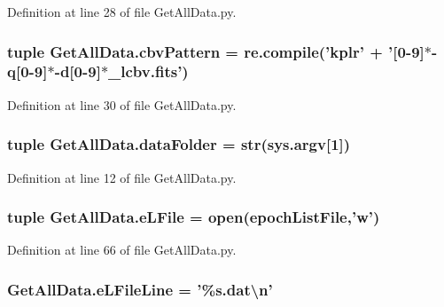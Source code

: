 Definition at line 28 of file Get\-All\-Data.\-py.

\hypertarget{namespace_get_all_data_ab13b78016ebaf3b18c13c40b75b9ae3a}{
\subsubsection[{cbv\-Pattern}]{\setlength{\rightskip}{0pt plus 5cm}tuple Get\-All\-Data.\-cbv\-Pattern = re.\-compile('kplr' + '\mbox{[}0-\/9\mbox{]}$\ast$-\/q\mbox{[}0-\/9\mbox{]}$\ast$-\/d\mbox{[}0-\/9\mbox{]}$\ast$\-\_\-lcbv.\-fits')}}\label{namespace_get_all_data_ab13b78016ebaf3b18c13c40b75b9ae3a}


Definition at line 30 of file Get\-All\-Data.\-py.

\hypertarget{namespace_get_all_data_a8ff73cf768ddd833d026b762528dc864}{
\subsubsection[{data\-Folder}]{\setlength{\rightskip}{0pt plus 5cm}tuple Get\-All\-Data.\-data\-Folder = str(sys.\-argv\mbox{[}1\mbox{]})}}\label{namespace_get_all_data_a8ff73cf768ddd833d026b762528dc864}


Definition at line 12 of file Get\-All\-Data.\-py.

\hypertarget{namespace_get_all_data_aaf35a1611b07a1bc49bb090dccfaef8e}{
\subsubsection[{e\-L\-File}]{\setlength{\rightskip}{0pt plus 5cm}tuple Get\-All\-Data.\-e\-L\-File = open({\bf epoch\-List\-File},'w')}}\label{namespace_get_all_data_aaf35a1611b07a1bc49bb090dccfaef8e}


Definition at line 66 of file Get\-All\-Data.\-py.

\hypertarget{namespace_get_all_data_acc2308c98b84b6b6eebcc695fff211ef}{
\subsubsection[{e\-L\-File\-Line}]{ Get\-All\-Data.\-e\-L\-File\-Line = '\%s.\-dat\textbackslash{}n'}}\label{namespace_get_all_data_acc2308c98b84b6b6eebcc695fff211ef}


